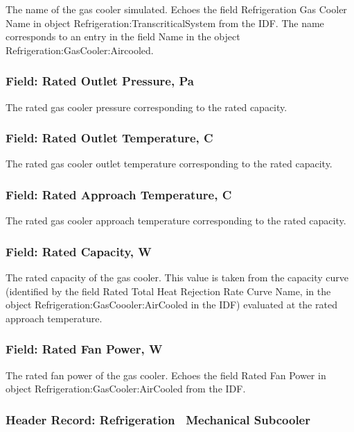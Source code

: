 The name of the gas cooler simulated. Echoes the field Refrigeration Gas Cooler Name in object Refrigeration:TranscriticalSystem from the IDF. The name corresponds to an entry in the field Name in the object Refrigeration:GasCooler:Aircooled.

\subsubsection{Field: Rated Outlet Pressure, Pa}\label{field-rated-outlet-pressure-pa}

The rated gas cooler pressure corresponding to the rated capacity.

\subsubsection{Field: Rated Outlet Temperature, C}\label{field-rated-outlet-temperature-c}

The rated gas cooler outlet temperature corresponding to the rated capacity.

\subsubsection{Field: Rated Approach Temperature, C}\label{field-rated-approach-temperature-c}

The rated gas cooler approach temperature corresponding to the rated capacity.

\subsubsection{Field: Rated Capacity, W}\label{field-rated-capacity-w-4}

The rated capacity of the gas cooler. This value is taken from the capacity curve (identified by the field Rated Total Heat Rejection Rate Curve Name, in the object Refrigeration:GasCoooler:AirCooled in the IDF) evaluated at the rated approach temperature.

\subsubsection{Field: Rated Fan Power, W}\label{field-rated-fan-power-w-2}

The rated fan power of the gas cooler. Echoes the field Rated Fan Power in object Refrigeration:GasCooler:AirCooled from the IDF.

\subsubsection{Header Record: Refrigeration~ Mechanical Subcooler}\label{header-record-refrigeration-mechanical-subcooler}

